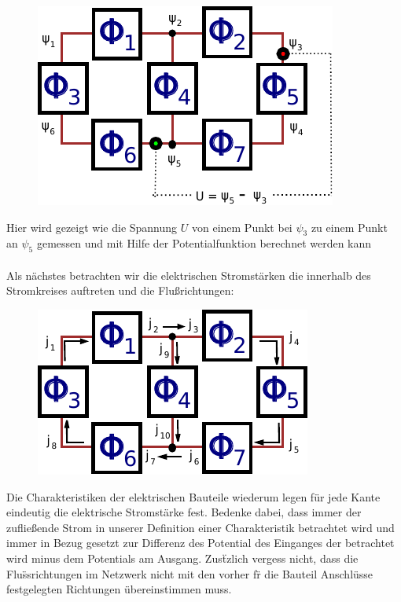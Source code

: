 \documentclass[11pt,a4paper,leqno]{report}
\numberwithin{equation}{chapter}
\begin{document}
\begin{figure}[H]
	\begin{center}
		\includegraphics[scale=1]{Bilder/potent.pdf}
	\end{center}
\end{figure}
\noindent
Hier wird gezeigt wie die Spannung $U$ von einem Punkt bei $\psi_3$ zu einem Punkt an $\psi_5$ gemessen und mit Hilfe der Potentialfunktion berechnet werden kann\\
\\
Als n\"achstes betrachten wir die elektrischen Stromst\"arken die innerhalb des Stromkreises auftreten und die Flu\ss{}richtungen: 
\begin{figure}[H]
	\begin{center}
		\includegraphics[scale=1]{Bilder/laminar.pdf}
	\end{center}
\end{figure}
\noindent
Die Charakteristiken der elektrischen Bauteile wiederum legen f\"ur jede Kante eindeutig die elektrische Stromst\"arke fest. Bedenke dabei, dass immer der zuflie\ss{}ende Strom in unserer Definition einer Charakteristik betrachtet wird und immer in Bezug gesetzt zur Differenz des Potential des Einganges der betrachtet wird minus dem Potentials am Ausgang. Zus\"tzlich vergess nicht, dass die Flu\"ss{}richtungen im Netzwerk nicht mit den vorher f\"r die Bauteil Anschl\"usse festgelegten Richtungen \"ubereinstimmen muss.\\
\end{document}
